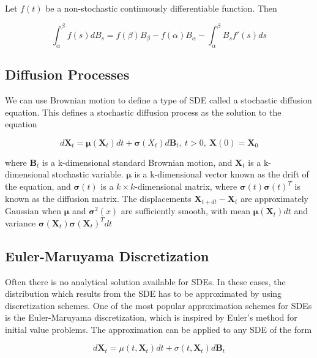 \cite{iacus_simulation_2008}


Let $f(t)$ be a non-stochastic continuously differentiable function. Then

$$\int_\alpha^\beta f(s)dB_s = f(\beta)B_\beta - f(\alpha)B_\alpha - \int_\alpha^\beta B_sf'(s) ds   $$



\subsection{Diffusion Processes}
\label{sec: diffusion processes}
We can use Brownian motion to define a type of SDE called a stochastic diffusion equation. This defines a stochastic diffusion process as the solution to the equation

\begin{equation}
    d{\textbf{X}}_t = {\pmb{\mu}} ({\textbf{X}}_t )dt + \pmb{\sigma}({X}_t ) d\textbf{B}_t, \   t > 0 , \ \textbf{X}(0) = \textbf{X}_0
\end{equation}

where $\textbf{B}_t$ is a k-dimensional standard Brownian motion, and $\textbf{X}_t$ is a k-dimensional stochastic variable. $\pmb{\mu}$ is a k-dimensional vector known as the drift of the equation, and $\pmb{\sigma}(t)$ is a $k\times k$-dimensional matrix, where $\pmb{\sigma}(t)\pmb{\sigma}(t)^T$ is known as the diffusion matrix. The displacements $\textbf{X}_{t+dt} - \textbf{X}_t$ are approximately Gaussian when $\pmb{\mu}$ and $\pmb{\sigma}^2(x)$ are sufficiently smooth, with mean $\pmb{\mu}(\textbf{X}_t)dt$ and variance $\pmb{\sigma}(\textbf{X}_t)\pmb{\sigma}(\textbf{X}_t)^Tdt$ \cite{bhattacharya_continuous_2023}




\subsection{Euler-Maruyama  Discretization}
\label{subsec: Euler-Maruyama}
Often there is no analytical solution available for SDEs. In these cases, the distribution which results from the SDE has to be approximated by using discretization schemes.  One of the most popular approximation schemes for SDEs is the Euler-Maruyama discretization, which is inspired by Euler's method for initial value problems. The approximation can be applied to any SDE of the form

\begin{equation}
    d\textbf{X}_t = \mu(t, \textbf{X}_t)dt + \sigma(t, \textbf{X}_t)d\textbf{B}_t
\end{equation}

